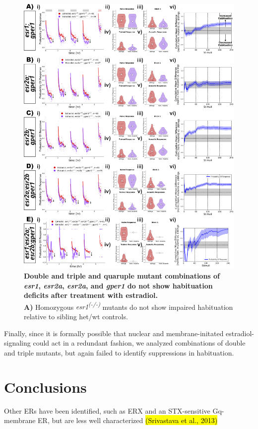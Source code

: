 \documentclass[9pt,lineno]{RandlettLab_elife}
\begin{document}
{\begin{figure}
\begin{fullwidth}
\begin{center}
\includegraphics[width=0.8\linewidth]{figures/gper1andNuclearMutants.png}
\caption{ \textbf{Double and triple and quaruple mutant combinations of \emph{esr1}, \emph{esr2a}, \emph{esr2a}, and \emph{gper1} do not show habituation deficits after treatment with estradiol.}
\\ \textbf{A)} Homozygous \emph{esr1\textsuperscript{(-/-)}} mutants do not show impaired habituation relative to sibling het/wt controls. 
}
\label{fig:5}
\end{center}
\end{fullwidth}
\end{figure}

Finally, since it is formally possible that nuclear and membrane-initated estradiol-signaling could act in a redundant fashion, we analyzed combinations of double and triple mutants, but again failed to identify suppressions in habituation. 
\section{Conclusions}

Other ERs have been identified, such as ERX and an STX-sensitive Gq-membrane ER, but are less well characterized \hl{(Srivastava et al., 2013)}

}
\end{document}
